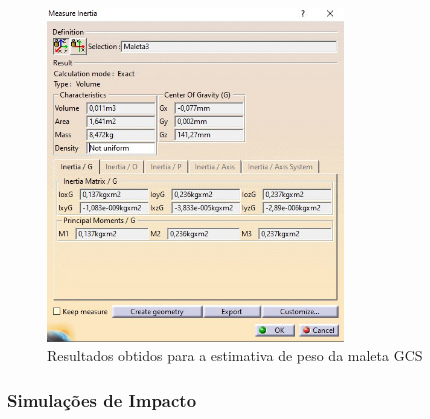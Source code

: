 \begin{figure}[H]
\centering
\includegraphics[width=0.7\textwidth]{figuras/PesoMA.jpg}
\caption{Resultados obtidos para a estimativa de peso da maleta GCS}
\label{fig:PesoMA}
\end{figure}

\subsubsection{Simulações de Impacto}

